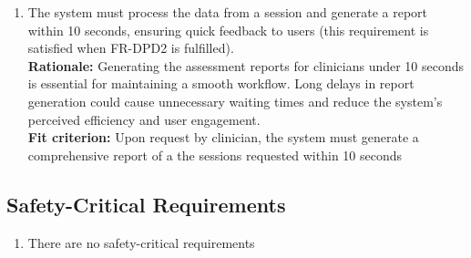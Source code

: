 \documentclass[12pt]{article}
\begin{document}
\begin{enumerate}[{PR-SL}4. ]
  \item The system must process the data from a session and generate a report within 10 seconds, ensuring quick feedback to users (this requirement is satisfied when FR-DPD2 is fulfilled).\\
  \textbf{Rationale: }Generating the assessment reports for clinicians under 10 seconds is essential for maintaining a smooth workflow. Long delays in report generation could cause unnecessary waiting times and reduce the system's perceived efficiency and user engagement.\\
  \textbf{Fit criterion: }Upon request by clinician, the system must generate a comprehensive report of a the sessions requested within 10 seconds  
\end{enumerate}

\subsection{Safety-Critical Requirements}
\begin{enumerate}[{PR-SCL}1. ]
  \item There are no safety-critical requirements
\end{enumerate}
\end{document}
